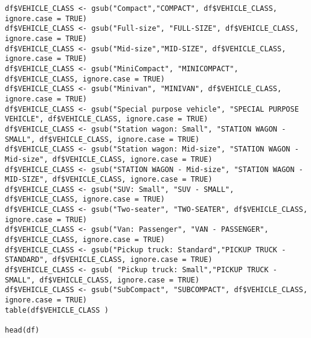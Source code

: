 \documentclass[12pt, a4paper,oneside]{book}
\numberwithin{equation}{section}
\begin{document}
\begin{lstlisting}
df$VEHICLE_CLASS <- gsub("Compact","COMPACT", df$VEHICLE_CLASS, ignore.case = TRUE)
df$VEHICLE_CLASS <- gsub("Full-size", "FULL-SIZE", df$VEHICLE_CLASS, ignore.case = TRUE)
df$VEHICLE_CLASS <- gsub("Mid-size","MID-SIZE", df$VEHICLE_CLASS, ignore.case = TRUE)
df$VEHICLE_CLASS <- gsub("MiniCompact", "MINICOMPACT", df$VEHICLE_CLASS, ignore.case = TRUE)
df$VEHICLE_CLASS <- gsub("Minivan", "MINIVAN", df$VEHICLE_CLASS, ignore.case = TRUE)
df$VEHICLE_CLASS <- gsub("Special purpose vehicle", "SPECIAL PURPOSE VEHICLE", df$VEHICLE_CLASS, ignore.case = TRUE)
df$VEHICLE_CLASS <- gsub("Station wagon: Small", "STATION WAGON - SMALL", df$VEHICLE_CLASS, ignore.case = TRUE)
df$VEHICLE_CLASS <- gsub("Station wagon: Mid-size", "STATION WAGON - Mid-size", df$VEHICLE_CLASS, ignore.case = TRUE)
df$VEHICLE_CLASS <- gsub("STATION WAGON - Mid-size", "STATION WAGON - MID-SIZE", df$VEHICLE_CLASS, ignore.case = TRUE)
df$VEHICLE_CLASS <- gsub("SUV: Small", "SUV - SMALL", df$VEHICLE_CLASS, ignore.case = TRUE)
df$VEHICLE_CLASS <- gsub("Two-seater", "TWO-SEATER", df$VEHICLE_CLASS, ignore.case = TRUE)
df$VEHICLE_CLASS <- gsub("Van: Passenger", "VAN - PASSENGER", df$VEHICLE_CLASS, ignore.case = TRUE)
df$VEHICLE_CLASS <- gsub("Pickup truck: Standard","PICKUP TRUCK - STANDARD", df$VEHICLE_CLASS, ignore.case = TRUE)
df$VEHICLE_CLASS <- gsub( "Pickup truck: Small","PICKUP TRUCK - SMALL", df$VEHICLE_CLASS, ignore.case = TRUE)
df$VEHICLE_CLASS <- gsub("SubCompact", "SUBCOMPACT", df$VEHICLE_CLASS, ignore.case = TRUE)
table(df$VEHICLE_CLASS )

head(df)



\end{lstlisting}
\end{document}
